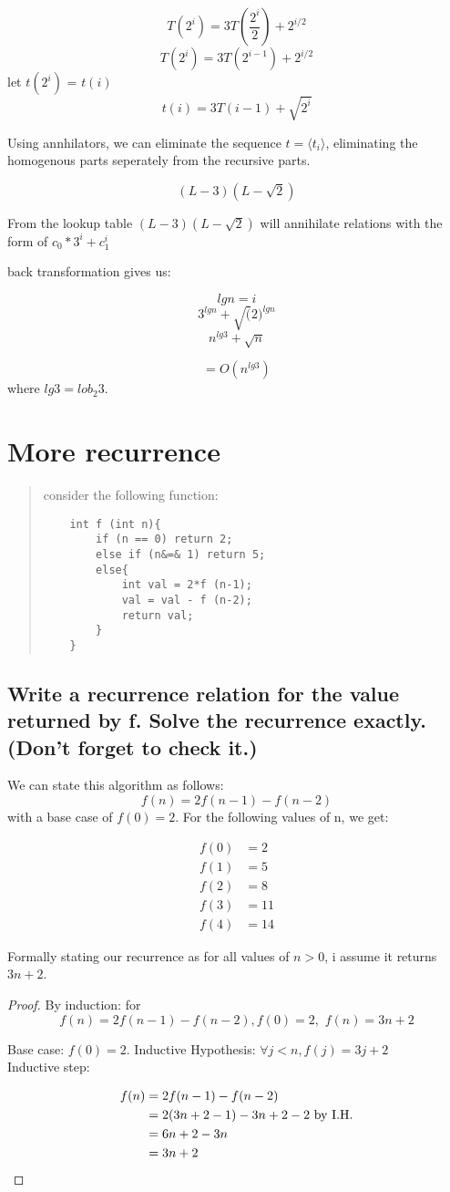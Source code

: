 \documentclass[titlepage]{article}\usepackage[]{graphicx}\usepackage[]{color}
\begin{document}
\[ T(2^i) = 3T(\frac{2^i}{2}) + 2^{i/2} \]
\[ T(2^i) = 3T(2^{i-1}) + 2^{i/2} \]
let $t(2^i)$ = $t(i)$
\[ t(i) = 3T(i-1) + \sqrt{2^i} \]

Using annhilators, we can eliminate the sequence $ t = \langle t_i \rangle $,
eliminating the homogenous parts seperately from the recursive parts.

\[ (L-3)(L-\sqrt{2})   \]

From the lookup table $(L-3) (L-\sqrt{2})$ will annihilate relations with the form
of $c_0*3^i + c_1^i $

back transformation gives us:

\[ lg n = i \]
\[ 3^{lg n} + \sqrt(2)^{lg n} \]
\[ n^{lg 3} + \sqrt{n} \]

\[ = O(n^{lg 3}) \]
where $lg 3 = lob_2 3$.




\section{More recurrence}

\begin{quote}
consider the following function:
\begin{lstlisting}
	int f (int n){
		if (n == 0) return 2;
		else if (n&=& 1) return 5;
		else{
			int val = 2*f (n-1);
			val = val - f (n-2);
			return val;
		}
	}
\end{lstlisting}
\end{quote}

\subsection{Write a recurrence relation for the value returned by f. Solve the
recurrence exactly. (Don't forget to check it.)}
We can state this algorithm as follows:
\[ f(n) = 2f(n-1) - f(n-2) \]
with a base case of $f(0) = 2$. For the following values of n, we get:

\begin{align}
	f(0) &= 2 \\
	f(1) &= 5 \\
	f(2) &= 8 \\
	f(3) &= 11 \\
	f(4) &= 14
	\label{eqn:something}
\end{align}

Formally stating our recurrence as 
for all values of $n > 0$,  i assume it returns $3n+2$. 
\begin{proof} By induction: for 
\[ f(n) = 2f(n-1) - f(n-2) , f(0) = 2,\,\, f(n) = 3n +2 \]

Base case: $f(0) = 2$.  
Inductive Hypothesis: $\forall j < n, f(j) = 3j + 2 $ \\
Inductive step: 

\begin{align*}
	f(n) &= 2f(n-1) - f(n-2) \\
	&= 2(3n + 2 -1) - 3n+2-2 \text{ by I.H.} \\
	&= 6n + 2 - 3n \\
	&= 3n + 2 \qedhere
\end{align*}
\end{proof}
\end{document}
